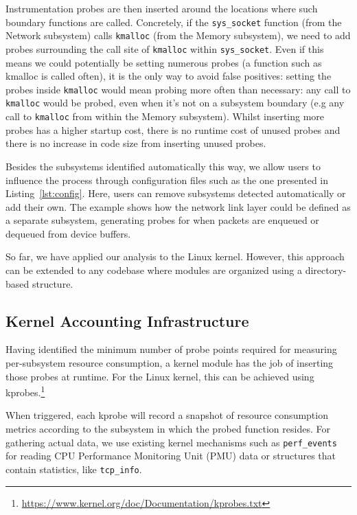 \documentclass[letterpaper,twocolumn,10pt]{article}
\begin{document}
Instrumentation probes are then inserted around the locations where such
boundary functions are called. Concretely, if the \texttt{sys\_socket} function
(from the Network subsystem) calls \texttt{kmalloc} (from the Memory subsystem),
we need to add probes surrounding the call site of \texttt{kmalloc} within
\texttt{sys\_socket}. Even if this means we could potentially be setting
numerous probes (a function such as kmalloc is called often), it is the only way
to avoid false positives: setting the probes inside \texttt{kmalloc} would mean
probing more often than necessary: any call to \texttt{kmalloc} would be probed,
even when it's not on a subsystem boundary (e.g any call to \texttt{kmalloc} from
within the Memory subsystem). Whilst inserting more probes has a higher startup
cost, there is no runtime cost of unused probes and there is no increase in code
size from inserting unused probes.

Besides the subsystems identified automatically this way, we allow users to
influence the process through configuration files such as the one presented in
Listing~\ref{lst:config}. Here, users can remove subsystems detected
automatically or add their own. The example shows how the network link layer
could be defined as a separate subsystem, generating probes for when packets are
enqueued or dequeued from device buffers.

So far, we have applied our analysis to the Linux kernel. However, this
approach can be extended to any codebase where modules are organized using a
directory-based structure.


\subsection{Kernel Accounting Infrastructure}

Having identified the minimum number of probe points required for measuring per-subsystem
resource consumption, a kernel module has the job of inserting those probes at runtime.
For the Linux kernel, this can be achieved using kprobes.\footnote{\url{https://www.kernel.org/doc/Documentation/kprobes.txt}}

When triggered, each kprobe will record a snapshot of resource consumption metrics according
to the subsystem in which the probed function resides. For gathering actual data, we
use existing kernel mechanisms such as \texttt{perf\_events} for reading CPU Performance Monitoring Unit (PMU)
data or structures that contain statistics, like \texttt{tcp\_info}.
\end{document}
